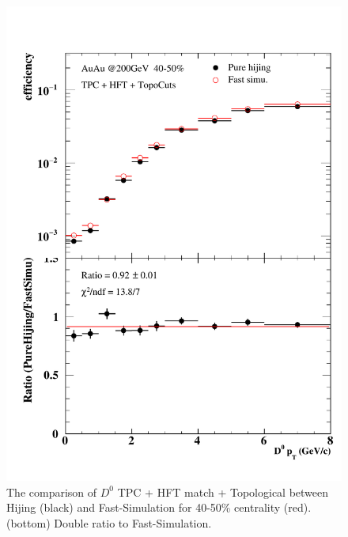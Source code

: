 \begin{figure}[htbp]
\begin{minipage}[htbp]{0.47\linewidth}
\includegraphics[width=1.0\textwidth,angle=0]{figure/Run14_D0HFT/40_50.pdf} 
\caption{ The comparison of $D^0$ TPC + HFT match + Topological between Hijing (black) and Fast-Simulation for 40-50\% centrality (red). (bottom) Double ratio to Fast-Simulation.\label{40_50}}
\end{minipage}
\end{figure}

